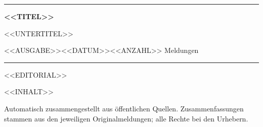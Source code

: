 \documentclass[a4paper,10pt]{scrartcl}
\begin{document}
\thispagestyle{empty}
{\color{amblau}\rule{\linewidth}{3pt}}\par\medskip
{\sffamily\fontsize{30}{34}\selectfont\bfseries\color{amblau}<<TITEL>>\par}
\smallskip
{\sffamily\large\color{amgrau}<<UNTERTITEL>>\par}
\medskip
{\sffamily\small\color{amakzent}<<AUSGABE>>\hfill<<DATUM>>\hfill <<ANZAHL>> Meldungen\par}
{\color{amblau}\rule{\linewidth}{0.8pt}}\par
\bigskip

<<EDITORIAL>>

{\sffamily\small\setcounter{tocdepth}{1}\renewcommand{\contentsname}{In dieser Ausgabe}\tableofcontents}

<<INHALT>>

\vfill
{\footnotesize\color{amgrau}Automatisch zusammengestellt aus öffentlichen Quellen. Zusammenfassungen
stammen aus den jeweiligen Originalmeldungen; alle Rechte bei den Urhebern.\par}
\end{document}
